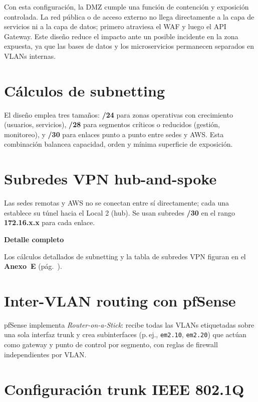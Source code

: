 \documentclass[11pt, a4paper, oneside]{report}
\newenvironment{notabox}[1]{%
  \begin{lrbox}{\notaboxsb}%
  \begin{minipage}{\dimexpr\textwidth-2\fboxsep\relax}%
  \vspace{4pt}\textcolor{upeu_dark}{\textbf{#1}}\\[2pt]\small%
}{%
  \vspace{4pt}%
  \end{minipage}%
  \end{lrbox}%
  \vspace{6pt}\par\noindent\colorbox{upeu_light}{\usebox{\notaboxsb}}\par\vspace{6pt}%
}
\begin{document}
\normalsize

Con esta configuración, la DMZ cumple una función de contención y exposición controlada. La red pública o de acceso externo no llega directamente a la capa de servicios ni a la capa de datos; primero atraviesa el WAF y luego el API Gateway. Este diseño reduce el impacto ante un posible incidente en la zona expuesta, ya que las bases de datos y los microservicios permanecen separados en VLANs internas.

\section{Cálculos de subnetting}

El diseño emplea tres tamaños: \textbf{/24} para zonas operativas con crecimiento (usuarios, servicios), \textbf{/28} para segmentos críticos o reducidos (gestión, monitoreo), y \textbf{/30} para enlaces punto a punto entre sedes y AWS. Esta combinación balancea capacidad, orden y mínima superficie de exposición.

\section{Subredes VPN hub-and-spoke}

Las sedes remotas y AWS no se conectan entre sí directamente; cada una establece su túnel hacia el Local 2 (hub). Se usan subredes \textbf{/30} en el rango \textbf{172.16.x.x} para cada enlace.

\begin{notabox}{Detalle completo}
Los cálculos detallados de subnetting y la tabla de subredes VPN figuran en el \textbf{Anexo~E} (pág.~\pageref{anex:subnetting}).
\end{notabox}
\section{Inter-VLAN routing con pfSense}

pfSense implementa \textit{Router-on-a-Stick}: recibe todas las VLANs etiquetadas sobre una sola interfaz trunk y crea subinterfaces (p.\,ej., \texttt{em2.10}, \texttt{em2.20}) que actúan como gateway y punto de control por segmento, con reglas de firewall independientes por VLAN.

\section{Configuración trunk IEEE 802.1Q}
\end{document}
